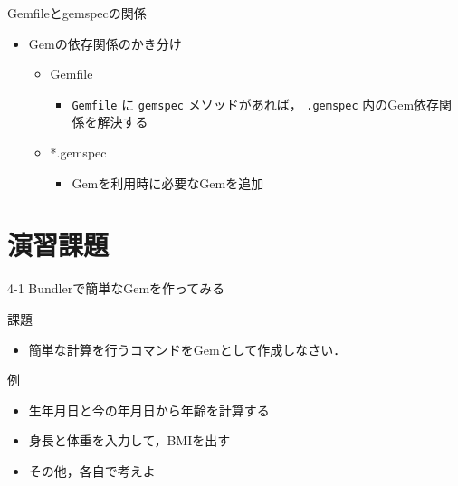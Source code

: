 \documentclass[t, aspectratio=169]{beamer}
\begin{document}
\begin{frame}[fragile,label=sec-4-3-6]{Gemfileとgemspecの関係}
 \begin{itemize}
\item Gemの依存関係のかき分け
\begin{itemize}
\item Gemfile
\begin{itemize}
\item \texttt{Gemfile} に \texttt{gemspec} メソッドがあれば， \texttt{.gemspec} 内のGem依存関係を解決する
\end{itemize}
\item *.gemspec
\begin{itemize}
\item Gemを利用時に必要なGemを追加
\end{itemize}
\end{itemize}
\end{itemize}
\end{frame}
\section{演習課題}
\label{sec-4-4}
\begin{frame}[label=sec-4-4-1]{4-1 Bundlerで簡単なGemを作ってみる}
\begin{block}{課題}
\begin{itemize}
\item 簡単な計算を行うコマンドをGemとして作成しなさい．
\end{itemize}
\end{block}

\begin{block}{例}
\begin{itemize}
\item 生年月日と今の年月日から年齢を計算する
\item 身長と体重を入力して，BMIを出す
\item その他，各自で考えよ
\end{itemize}
\end{block}
\end{frame}
\end{document}
